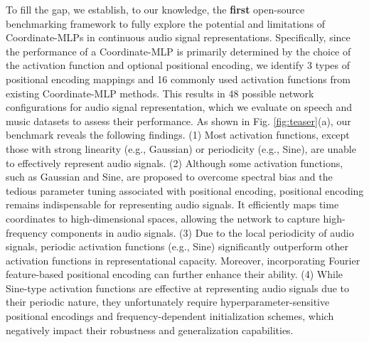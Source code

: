 \documentclass[letterpaper]{article} %
\begin{document}
To fill the gap, we establish, to our knowledge, the \textbf{first} open-source benchmarking framework to fully explore the potential and limitations of Coordinate-MLPs in continuous audio signal representations. Specifically, since the performance of a Coordinate-MLP is primarily determined by the choice of the activation function and optional positional encoding, we identify 3 types of positional encoding mappings and 16 commonly used activation functions from existing Coordinate-MLP methods. This results in 48 possible network configurations for audio signal representation, which we evaluate on speech and music datasets to assess their performance.
As shown in Fig. \ref{fig:teaser}(a), our benchmark reveals the following findings. (1) Most activation functions, except those with strong linearity (e.g., Gaussian) or periodicity (e.g., Sine), are unable to effectively represent audio signals. (2) Although some activation functions, such as Gaussian and Sine, are proposed to overcome spectral bias and the tedious parameter tuning associated with positional encoding, positional encoding remains indispensable for representing audio signals. It efficiently maps time coordinates to high-dimensional spaces, allowing the network to capture high-frequency components in audio signals. (3) Due to the local periodicity of audio signals, periodic activation functions (e.g., Sine) significantly outperform other activation functions in representational capacity. Moreover, incorporating Fourier feature-based positional encoding can further enhance their ability. (4) While Sine-type activation functions are effective at representing audio signals due to their periodic nature, they unfortunately require hyperparameter-sensitive positional encodings and frequency-dependent initialization schemes, which negatively impact their robustness and generalization capabilities.
\end{document}
